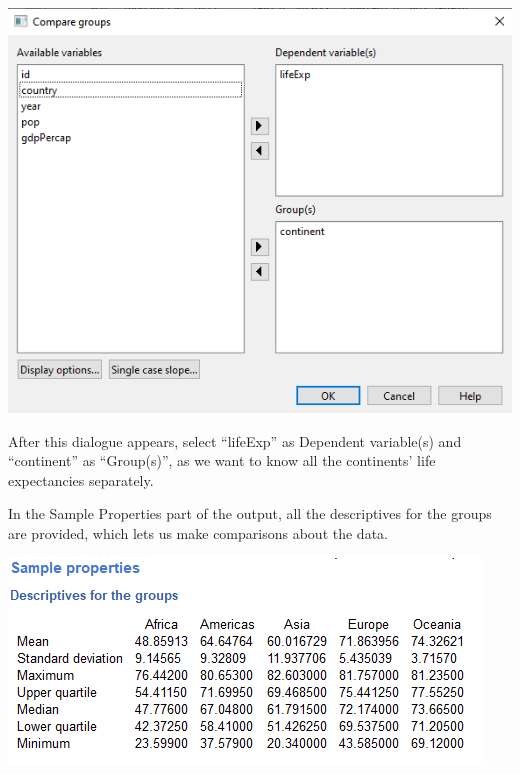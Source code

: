 \documentclass[
]{book}
\begin{document}
\includegraphics{img/ch2/comparewindow.png}

After this dialogue appears, select ``lifeExp'' as Dependent variable(s) and ``continent'' as ``Group(s)'', as we want to know all the continents' life expectancies separately.

In the Sample Properties part of the output, all the descriptives for the groups are provided, which lets us make comparisons about the data.

\includegraphics{img/ch2/comparegresults.png}
\end{document}
